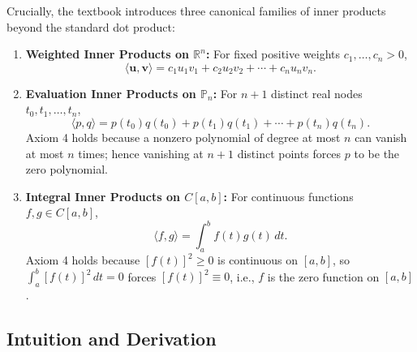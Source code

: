 \documentclass[11pt, letterpaper]{article}
\theoremstyle{definition}
\theoremstyle{remark}
\begin{document}
Crucially, the textbook introduces three canonical families of inner products beyond the standard dot product:
\begin{enumerate}
    \item \textbf{Weighted Inner Products on $\mathbb{R}^n$:} For fixed positive weights $c_1, \dots, c_n > 0$,
    \[
        \langle \mathbf{u}, \mathbf{v} \rangle = c_1 u_1 v_1 + c_2 u_2 v_2 + \cdots + c_n u_n v_n.
    \]
    \item \textbf{Evaluation Inner Products on $\mathbb{P}_n$:} For $n+1$ distinct real nodes $t_0, t_1, \dots, t_n$,
    \[
        \langle p, q \rangle = p(t_0)q(t_0) + p(t_1)q(t_1) + \cdots + p(t_n)q(t_n).
    \]
    Axiom 4 holds because a nonzero polynomial of degree at most $n$ can vanish at most $n$ times; hence vanishing at $n+1$ distinct points forces $p$ to be the zero polynomial.
    \item \textbf{Integral Inner Products on $C[a, b]$:} For continuous functions $f, g \in C[a, b]$,
    \[
        \langle f, g \rangle = \int_a^b f(t)g(t)\,dt.
    \]
    Axiom 4 holds because $[f(t)]^2 \ge 0$ is continuous on $[a, b]$, so $\int_a^b [f(t)]^2\,dt = 0$ forces $[f(t)]^2 \equiv 0$, i.e., $f$ is the zero function on $[a, b]$.
\end{enumerate}

\subsection{Intuition and Derivation}
\end{document}
